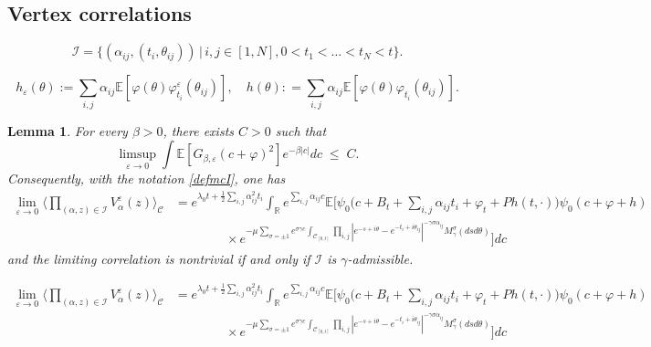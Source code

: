 \documentclass[10pt,a4paper]{amsart}
\newtheorem{lemma}{Lemma}
\newcommand{\R}{\mathbb{R}}
\newcommand{\cjd}{\rangle}
\newcommand{\cjg}{\langle}
\def\eps{\varepsilon}
\renewcommand{\leq}{\;\leqslant\;}                   %
\newcommand{\mc}{\mathcal}
\begin{document}
\subsection{Vertex correlations} \label{subsec:_vertex_correlations}

\begin{equation}\label{defmcI}
\mathcal I
=
\{ (\alpha_{ij}, (t_i, \theta_{ij})) \,|\,  i,j\in [1,N],  0 < t_1 < \dots < t_N<t \}.	
\end{equation}

\begin{equation}\label{def_of_h}
h_\eps(\theta)
:=
\sum_{i,j} \alpha_{ij}\mathbb E[ \varphi(\theta) \varphi^\eps_{t_i}(\theta_{ij})], \quad h(\theta): = \sum_{i,j} \alpha_{ij}\mathbb E[ \varphi(\theta) \varphi_{t_i}(\theta_{ij})].
\end{equation}

\begin{lemma}\label{lem: vertex correlations}
For every $\beta > 0$, there exists $C>0$ such that
\begin{equation} \label{eq: vc unif l2}
\limsup_{\eps \rightarrow 0}\int \mathbb{E}[G_{\beta,\eps}(c+\varphi)^2] e^{-\beta |c|}dc
\leq
C. 
\end{equation}
Consequently, with the notation \eqref{defmcI}, one has 
\begin{align}\label{eq: vc limit}
\lim_{\eps \rightarrow 0}\Big\cjg \prod_{(\alpha,z)\in \mc{I}}V^\eps_{\alpha}(z)\Big\cjd_{\mc{C}}	
&=
e^{\lambda_0 t+\frac{1}{2}\sum_{i,j}\alpha_{ij}^2t_i}  \int_{\R} e^{\sum_{i,j}\alpha_{ij} c}\mathbb{E}\big[\psi_0\big(c+B_t+\sum_{i,j} \alpha_{ij}t_i+ \varphi_t + Ph (t,\cdot))\psi_0(c+\varphi+h) 
\\
& \qquad \qquad \times e^{-\mu \sum_{\sigma = \pm 1} e^{\sigma\gamma c} \int_{\mathcal{C}_{[0,t]}} \prod_{i,j} |e^{-s+i\theta}-e^{-t_i+i\theta_{ij}}|^{-\gamma \sigma \alpha_{ij}} M^\sigma_\gamma(dsd\theta)}\big ]dc
\end{align}
and the limiting correlation is nontrivial if and only if $\mathcal I$ is $\gamma$-admissible.

\end{lemma}

\begin{align}
\lim_{\eps \rightarrow 0}\Big\cjg \prod_{(\alpha,z)\in \mc{I}}V^\eps_{\alpha}(z)\Big\cjd_{\mc{C}}	
&=
e^{\lambda_0 t+\frac{1}{2}\sum_{i,j}\alpha_{ij}^2t_i}  \int_{\R} e^{\sum_{i,j}\alpha_{ij} c}\mathbb{E}\big[\psi_0\big(c+B_t+\sum_{i,j} \alpha_{ij}t_i+ \varphi_t + Ph (t,\cdot))\psi_0(c+\varphi+h) 
\\
& \qquad \qquad \times e^{-\mu \sum_{\sigma = \pm 1} e^{\sigma\gamma c} \int_{\mathcal{C}_{[0,t]}} \prod_{i,j} |e^{-s+i\theta}-e^{-t_i+i\theta_{ij}}|^{-\gamma \sigma \alpha_{ij}} M^\sigma_\gamma(dsd\theta)}\big ]dc
\end{align}
\end{document}
